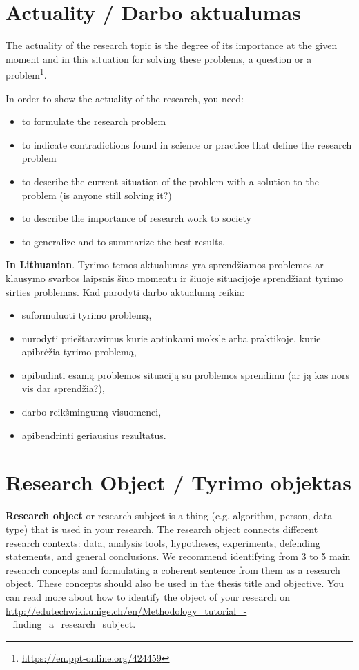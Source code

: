 \section*{Actuality / Darbo aktualumas}

The actuality of the research topic is the degree of its importance at the given moment and in this situation for solving these problems, a question or a problem\footnote{\url{https://en.ppt-online.org/424459}}.

In order to show the actuality of the research, you need:
\begin{itemize}
    \item to formulate the research problem
    \item to indicate contradictions found in science or practice that define the research problem
    \item to describe the current situation of the problem with a solution to the problem (is anyone still solving it?)
    \item to describe the importance of research work to society
    \item to generalize and to summarize the best results.
\end{itemize}

\textbf{In Lithuanian}.
Tyrimo temos aktualumas yra sprendžiamos problemos ar klausymo svarbos laipsnis šiuo momentu ir šiuoje situacijoje sprendžiant tyrimo sirties problemas.
Kad parodyti darbo aktualumą reikia:
\begin{itemize}
    \item suformuluoti tyrimo problemą,
    \item nurodyti prieštaravimus kurie aptinkami moksle arba praktikoje, kurie apibrėžia tyrimo problemą, 
    \item apibūdinti esamą problemos situaciją su problemos sprendimu (ar ją kas nors vis dar sprendžia?),
    \item darbo reikšmingumą visuomenei,
    \item apibendrinti geriausius rezultatus.
\end{itemize}


\section*{Research Object / Tyrimo objektas}

\textbf{Research object} or research subject is a thing (e.g. algorithm, person, data type) that is used in your research. The research object connects different research contexts: data, analysis tools, hypotheses, experiments, defending statements, and general conclusions. We recommend identifying from 3 to 5 main research concepts and formulating a coherent sentence from them as a research object.
These concepts should also be used in the thesis title and objective. You can read more about how to identify the object of your research on  \url{http://edutechwiki.unige.ch/en/Methodology_tutorial_-_finding_a_research_subject}.

